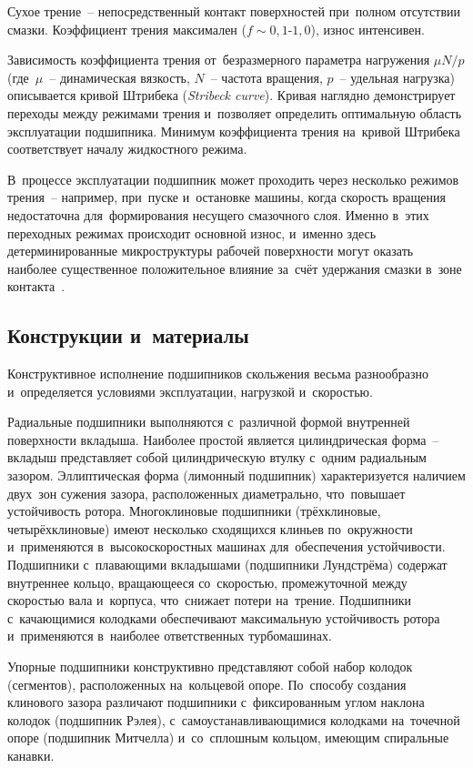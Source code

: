 Сухое трение~-- непосредственный контакт поверхностей при~полном отсутствии смазки. Коэффициент трения максимален ($f \sim 0{,}1\text{-}1{,}0$), износ интенсивен.

Зависимость коэффициента трения от~безразмерного параметра нагружения $\mu N / p$ (где~$\mu$~-- динамическая вязкость, $N$~-- частота вращения, $p$~-- удельная нагрузка) описывается кривой Штрибека (\textit{Stribeck curve}). Кривая наглядно демонстрирует переходы между режимами трения и~позволяет определить оптимальную область эксплуатации подшипника. Минимум коэффициента трения на~кривой Штрибека соответствует началу жидкостного режима.

В~процессе эксплуатации подшипник может проходить через несколько режимов трения~-- например, при~пуске и~остановке машины, когда скорость вращения недостаточна для~формирования несущего смазочного слоя. Именно в~этих переходных режимах происходит основной износ, и~именно здесь детерминированные микроструктуры рабочей поверхности могут оказать наиболее существенное положительное влияние за~счёт удержания смазки в~зоне контакта~\cite{senatore2018,bashmur2022}.

\subsection{Конструкции и~материалы}

Конструктивное исполнение подшипников скольжения весьма разнообразно и~определяется условиями эксплуатации, нагрузкой и~скоростью.

Радиальные подшипники выполняются с~различной формой внутренней поверхности вкладыша. Наиболее простой является цилиндрическая форма~-- вкладыш представляет собой цилиндрическую втулку с~одним радиальным зазором. Эллиптическая форма (лимонный подшипник) характеризуется наличием двух~зон сужения зазора, расположенных диаметрально, что~повышает устойчивость ротора. Многоклиновые подшипники (трёхклиновые, четырёхклиновые) имеют несколько сходящихся клиньев по~окружности и~применяются в~высокоскоростных машинах для~обеспечения устойчивости. Подшипники с~плавающими вкладышами (подшипники Лундстрёма) содержат внутреннее кольцо, вращающееся со~скоростью, промежуточной между скоростью вала и~корпуса, что~снижает потери на~трение. Подшипники с~качающимися колодками обеспечивают максимальную устойчивость ротора и~применяются в~наиболее ответственных турбомашинах.

Упорные подшипники конструктивно представляют собой набор колодок (сегментов), расположенных на~кольцевой опоре. По~способу создания клинового зазора различают подшипники с~фиксированным углом наклона колодок (подшипник Рэлея), с~самоустанавливающимися колодками на~точечной опоре (подшипник Митчелла) и~со~сплошным кольцом, имеющим спиральные канавки.

